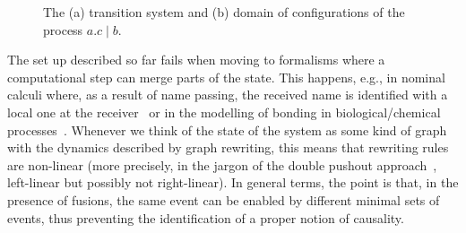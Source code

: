 \documentclass[conference]{IEEEtran}
\begin{document}
\begin{figure}
  \caption{The (a) transition system and (b) domain of configurations
    of the process $a.c \mid b$.}
  \label{fi:ccs}
\end{figure}


The set up described so far fails when moving to formalisms where a
computational step can merge parts of the state. This happens, e.g.,
in nominal calculi where, as a result of name passing,
the received name is identified with a local one at the
receiver~\cite{CVY:ESSPE,Gad07} or in the modelling of bonding in biological/chemical processes~\cite{PUY:MBPE}.
%
Whenever we think of the state of the system as some kind of graph
with the dynamics described by graph rewriting, this means that rewriting rules
are non-linear (more precisely, in the jargon of the double pushout
approach~\cite{Ehr:TIAA}, left-linear but possibly not right-linear).
%
%
In general terms, the point is that, in the presence of fusions, the
same event can be enabled by different minimal sets of events, thus
preventing the identification of a proper notion of causality.
\end{document}
